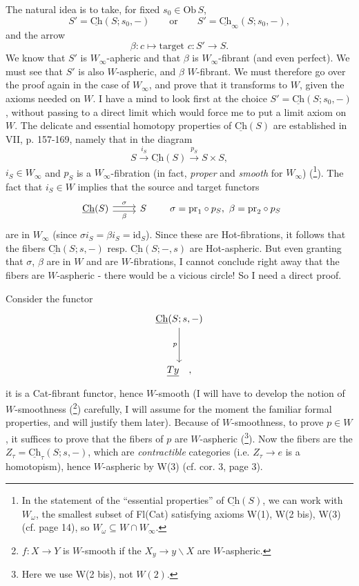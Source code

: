 \documentclass[11pt]{article}
\newcommand{\printedpage}[1]{\marginpar{\footnotesize p.~#1}}
\newcommand{\msp}[1]{\marginpar{\footnotesize [#1]}}
\newcommand{\Ch}{\underline{\mathrm{Ch}}}
\begin{document}
The natural idea is to take, for fixed $s_0 \in \mathrm{Ob}\,S$,
\[ S' = \Ch(S; s_0, -) \qquad \text{or} \qquad S' = \Ch_\infty(S; s_0, -), \]
and the arrow
\[ \beta : c \longmapsto \text{target } c : S' \longrightarrow S. \]
We know that $S'$ is $W_\infty$-apheric and that $\beta$ is $W_\infty$-fibrant (and even perfect). We must see that $S'$ is also $W$-aspheric, and $\beta$ $W$-fibrant. We must therefore go over the proof again in the case of $W_\infty$, and prove that it transforms to $W$, %
\msp{page 8}
given the axioms needed on $W$. I have a mind to look first at the choice $S' = \Ch(S; s_0, -)$, without passing to a direct limit which would force me to put a limit axiom on $W$. The delicate and essential homotopy properties of $\Ch(S)$ are established in VII, p. 157-169, namely that in the diagram
\[ S \xrightarrow{i_S} \Ch(S) \xrightarrow{p_S} S \times S, \]
$i_S \in W_\infty$ and $p_S$ is a $W_\infty$-fibration (in fact, \textit{proper} and \textit{smooth} for $W_\infty$) (\footnote[12]{In the statement of the ``essential properties'' of $\Ch(S)$, we can work with $W_\omega$, the smallest subset of Fl(Cat) satisfying axioms W(1), W(2 bis), W(3) (cf. page 14), so $W_\omega \subseteq W \cap W_\infty$.}). The fact that $i_S \in W$ implies that the source and target functors
\[ \begin{tikzcd} \Ch(S) \arrow[r, shift left, "\sigma"] \arrow[r, shift right, "\beta"'] & S \end{tikzcd} \qquad \sigma = \mathrm{pr}_1 \circ p_S,\ \beta = \mathrm{pr}_2 \circ p_S \]
are in $W_\infty$ (since $\sigma i_S = \beta i_S = \mathrm{id}_S$). Since these are Hot-fibrations, it follows that the fibers $\Ch(S; s, -)$ resp. $\Ch(S; -, s)$ are Hot-aspheric. But even granting that $\sigma$, $\beta$ are in $W$ and are $W$-fibrations, I cannot conclude right away that the fibers are $W$-aspheric - there would be a vicious circle! So I need a direct proof.

Consider the functor
\[
\begin{tikzcd}[row sep=huge]
\Ch(S; s, -) \arrow[d, "p"'] \\
\underline{Ty} \quad ,
\end{tikzcd}
\]
\printedpage{8}
it is a Cat-fibrant functor, hence $W$-smooth (I will have to develop the notion of $W$-smoothness (\footnote[13]{$f : X \longrightarrow Y$ is $W$-smooth if the $X_y \longrightarrow y\backslash X$ are $W$-aspheric.}) carefully, I will assume for the moment the familiar formal properties, and will justify them later). Because of $W$-smoothness, to prove $p \in W$, it suffices to
\msp{page 9}
prove that the fibers of $p$ are $W$-aspheric (\footnote[14]{Here we use W(2 bis), not $W(2)$.}). Now the fibers are the $Z_\tau = \Ch_\tau(S; s, -)$, which are \textit{contractible} categories (i.e. $Z_\tau \longrightarrow e$ is a homotopism), hence $W$-aspheric by W(3) (cf. cor. 3, page 3).
\end{document}
